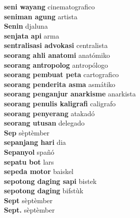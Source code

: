 \textbf{ seni wayang  } cinematografico \\
\textbf{ seniman agung  } artista \\
\textbf{ Senin  } djaluna \\
\textbf{ senjata api  } arma \\
\textbf{ sentralisasi advokasi  } centralista \\
\textbf{ seorang ahli anatomi  } anatómiko \\
\textbf{ seorang antropolog  } antropólogo \\
\textbf{ seorang pembuat peta  } cartografico \\
\textbf{ seorang penderita asma  } asmátiko \\
\textbf{ seorang penganjur anarkisme  } anarkista \\
\textbf{ seorang penulis kaligrafi  } caligrafo \\
\textbf{ seorang penyerang  } atakadó \\
\textbf{ seorang utusan  } delegado \\
\textbf{ Sep  } sèptèmber \\
\textbf{ sepanjang hari  } dia \\
\textbf{ Sepanyol  } spañó \\
\textbf{ sepatu bot  } lars \\
\textbf{ sepeda motor  } baiskel \\
\textbf{ sepotong daging sapi  } bistek \\
\textbf{ sepotong daging  } bifstùk \\
\textbf{ Sept  } sèptèmber \\
\textbf{ Sept.  } sèptèmber \\
